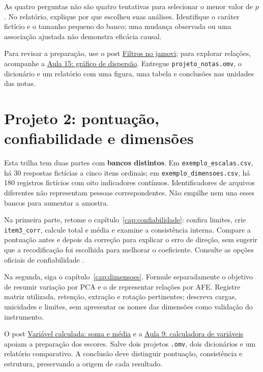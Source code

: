 As quatro perguntas não são quatro tentativas para selecionar o menor valor de $p$. No relatório, explique por que escolheu suas análises. Identifique o caráter fictício e o tamanho pequeno do banco; uma mudança observada ou uma associação ajustada não demonstra eficácia causal.

Para revisar a preparação, use o post \href{https://www.balaiocientifico.com/2026/10/filtros-no-jamovi-selecionar-dados.html}{Filtros no jamovi}; para explorar relações, acompanhe a \href{https://www.youtube.com/watch?v=K507gYOjBMA}{Aula 15: gráfico de dispersão}. Entregue \texttt{projeto\_notas.omv}, o dicionário e um relatório com uma figura, uma tabela e conclusões nas unidades das notas.

\section{Projeto 2: pontuação, confiabilidade e dimensões}

Esta trilha tem duas partes com \textbf{bancos distintos}. Em \texttt{exemplo\_escalas.csv}, há 30 respostas fictícias a cinco itens ordinais; em \texttt{exemplo\_dimensoes.csv}, há 180 registros fictícios com oito indicadores contínuos. Identificadores de arquivos diferentes não representam pessoas correspondentes. Não empilhe nem una esses bancos para aumentar a amostra.

Na primeira parte, retome o capítulo~\ref{cap:confiabilidade}: confira limites, crie \texttt{item3\_corr}, calcule total e média e examine a consistência interna. Compare a pontuação antes e depois da correção para explicar o erro de direção, sem sugerir que a recodificação foi escolhida para melhorar o coeficiente. Consulte as opções oficiais de confiabilidade \parencite{JamoviConfiabilidade}.

Na segunda, siga o capítulo~\ref{cap:dimensoes}. Formule separadamente o objetivo de resumir variação por PCA e o de representar relações por AFE. Registre matriz utilizada, retenção, extração e rotação pertinentes; descreva cargas, unicidades e limites, sem apresentar os nomes das dimensões como validação do instrumento.

O post \href{https://www.balaiocientifico.com/2026/10/como-criar-uma-variavel-calculada-no.html}{Variável calculada: soma e média} e a \href{https://www.youtube.com/watch?v=NBvQphd9FqI}{Aula 9: calculadora de variáveis} apoiam a preparação dos escores. Salve dois projetos \texttt{.omv}, dois dicionários e um relatório comparativo. A conclusão deve distinguir pontuação, consistência e estrutura, preservando a origem de cada resultado.

